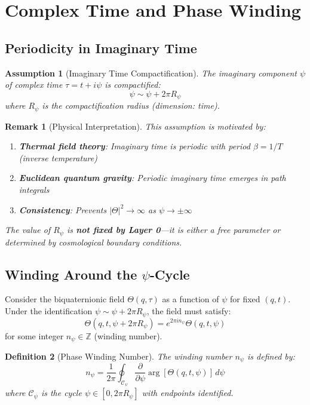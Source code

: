 \documentclass[12pt]{article}
\newtheorem{definition}{Definition}[section]
\newtheorem{remark}[definition]{Remark}
\newtheorem{assumption}{Assumption}[section]
\newcommand{\Z}{\mathbb{Z}}
\begin{document}
\section{Complex Time and Phase Winding}
\label{sec:phase_winding}

\subsection{Periodicity in Imaginary Time}

\begin{assumption}[Imaginary Time Compactification]
\label{ass:periodic_psi}
The imaginary component $\psi$ of complex time $\tau = t + i\psi$ is compactified:
\begin{equation}
\psi \sim \psi + 2\pi R_\psi
\end{equation}
where $R_\psi$ is the compactification radius (dimension: time).
\end{assumption}

\begin{remark}[Physical Interpretation]
This assumption is motivated by:
\begin{enumerate}
    \item \textbf{Thermal field theory}: Imaginary time is periodic with period $\beta = 1/T$ (inverse temperature)
    \item \textbf{Euclidean quantum gravity}: Periodic imaginary time emerges in path integrals
    \item \textbf{Consistency}: Prevents $|\Theta|^2 \to \infty$ as $\psi \to \pm\infty$
\end{enumerate}
The value of $R_\psi$ is \textbf{not fixed by Layer 0}—it is either a free parameter or determined by cosmological boundary conditions.
\end{remark}

\subsection{Winding Around the $\psi$-Cycle}

Consider the biquaternionic field $\Theta(q, \tau)$ as a function of $\psi$ for fixed $(q, t)$. Under the identification $\psi \sim \psi + 2\pi R_\psi$, the field must satisfy:
\begin{equation}
\Theta(q, t, \psi + 2\pi R_\psi) = e^{2\pi i n_\psi} \Theta(q, t, \psi)
\end{equation}
for some integer $n_\psi \in \Z$ (winding number).

\begin{definition}[Phase Winding Number]
The winding number $n_\psi$ is defined by:
\begin{equation}
n_\psi = \frac{1}{2\pi} \oint_{\mathcal{C}_\psi} \frac{\partial}{\partial \psi} \arg[\Theta(q, t, \psi)] \, d\psi
\label{eq:winding_definition}
\end{equation}
where $\mathcal{C}_\psi$ is the cycle $\psi \in [0, 2\pi R_\psi]$ with endpoints identified.
\end{definition}
\end{document}
